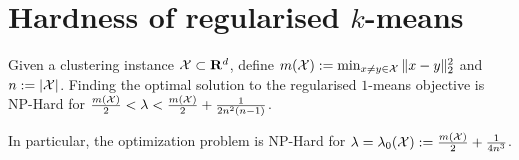 \section{Hardness of regularised $k$-means}
\label{a-section:hardness}
\begin{theorem}
\label{a-theorem:hardFork1Fixed}
Given a clustering instance $\mathcal X \subset \mathbf R^{d}$, define $m(\mathcal X) := \min_{x \neq y \in \mathcal X} \|x-y\|_{2}^2$ and $n := |\mathcal X|$. Finding the optimal solution to the regularised $1$-means objective is NP-Hard for $\frac{m(\mathcal X)}{2} < \lambda < \frac{m(\mathcal X)}{2} + \frac{1}{2n^2(n-1)}$. 

In particular, the optimization problem is NP-Hard for $\lambda = \lambda_0(\mathcal X) := \frac{m(\mathcal X)}{2} + \frac{1}{4n^3}$.
\end{theorem}

